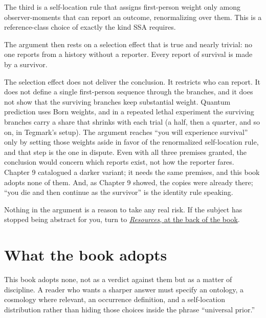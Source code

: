 The third is a self-location rule that assigns first-person weight only among observer-moments that can report an outcome, renormalizing over them. This is a reference-class choice of exactly the kind SSA requires.

The argument then rests on a selection effect that is true and nearly trivial: no one reports from a history without a reporter. Every report of survival is made by a survivor.

The selection effect does not deliver the conclusion. It restricts who can report. It does not define a single first-person sequence through the branches, and it does not show that the surviving branches keep substantial weight. Quantum prediction uses Born weights, and in a repeated lethal experiment the surviving branches carry a share that shrinks with each trial (a half, then a quarter, and so on, in Tegmark's setup). The argument reaches ``you will experience survival'' only by setting those weights aside in favor of the renormalized self-location rule, and that step is the one in dispute. Even with all three premises granted, the conclusion would concern which reports exist, not how the reporter fares. Chapter 9 catalogued a darker variant; it needs the same premises, and this book adopts none of them. And, as Chapter 9 showed, the copies were already there; ``you die and then continue as the survivor'' is the identity rule speaking.

Nothing in the argument is a reason to take any real risk. If the subject has stopped being abstract for you, turn to \hyperref[resources]{\textit{Resources}, at the back of the book}.

\section*{What the book adopts}

This book adopts none, not as a verdict against them but as a matter of discipline. A reader who wants a sharper answer must specify an ontology, a cosmology where relevant, an occurrence definition, and a self-location distribution rather than hiding those choices inside the phrase ``universal prior.''
